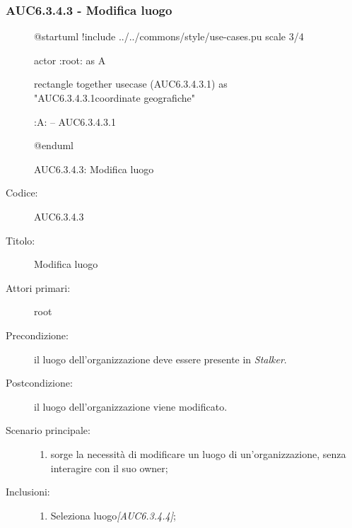 \documentclass[casi-duso]{subfiles}
\begin{document}
\subsubsection{AUC6.3.4.3 - Modifica luogo}%
\label{subsub:AUC6.3.4.3}

\begin{figure}[h!]
  \centering
  \begin{plantuml}
  @startuml
  !include ../../commons/style/use-cases.pu
  scale 3/4

  actor :root: as A

  rectangle {
    together {
      usecase (AUC6.3.4.3.1) as "AUC6.3.4.3.1\nModifica coordinate geografiche"
    }
  }

  :A: -- AUC6.3.4.3.1

  @enduml
  \end{plantuml}
  \caption{AUC6.3.4.3: Modifica luogo}
  \label{fig:auc6_3_4_3}
\end{figure}

\begin{description}
  \item[Codice:] AUC6.3.4.3
  \item[Titolo:] Modifica luogo
  \item[Attori primari:] root
  \item[Precondizione:] il luogo dell'organizzazione deve essere presente in \emph{Stalker}.
  \item[Postcondizione:] il luogo dell'organizzazione viene modificato.
  \item[Scenario principale:]
  \begin{enumerate}
    \item sorge la necessità di modificare un luogo di un'organizzazione, senza interagire con il suo owner;
  \end{enumerate}
  \item[Inclusioni:]
  \begin{enumerate}
    \item Seleziona luogo\emph{[AUC6.3.4.4]};
  \end{enumerate}
\end{description}
\end{document}
